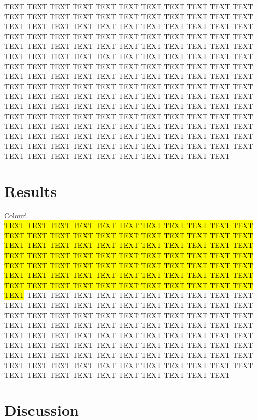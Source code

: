 \documentclass{article}
\begin{document}
TEXT TEXT TEXT TEXT TEXT TEXT TEXT TEXT TEXT TEXT TEXT TEXT TEXT TEXT TEXT TEXT TEXT TEXT TEXT TEXT TEXT TEXT TEXT TEXT TEXT TEXT TEXT TEXT TEXT TEXT TEXT TEXT TEXT TEXT TEXT TEXT TEXT TEXT TEXT TEXT TEXT TEXT TEXT TEXT TEXT TEXT TEXT TEXT TEXT TEXT TEXT TEXT TEXT TEXT TEXT TEXT TEXT TEXT TEXT TEXT TEXT TEXT TEXT TEXT TEXT TEXT TEXT TEXT TEXT TEXT TEXT TEXT TEXT TEXT TEXT TEXT TEXT TEXT TEXT TEXT TEXT TEXT TEXT TEXT TEXT TEXT TEXT TEXT TEXT TEXT TEXT TEXT TEXT TEXT TEXT TEXT TEXT TEXT TEXT TEXT TEXT TEXT TEXT TEXT TEXT TEXT TEXT TEXT TEXT TEXT TEXT TEXT TEXT TEXT TEXT TEXT TEXT TEXT TEXT TEXT TEXT TEXT TEXT TEXT TEXT TEXT TEXT TEXT TEXT TEXT TEXT TEXT TEXT TEXT TEXT TEXT TEXT TEXT TEXT TEXT TEXT TEXT TEXT TEXT TEXT TEXT TEXT TEXT TEXT TEXT TEXT TEXT TEXT TEXT TEXT TEXT TEXT TEXT TEXT TEXT TEXT TEXT TEXT TEXT TEXT TEXT TEXT TEXT TEXT TEXT TEXT TEXT TEXT TEXT TEXT 


\section{Results}
Colour!\\
\hl{TEXT TEXT TEXT TEXT TEXT TEXT TEXT TEXT TEXT TEXT TEXT TEXT TEXT TEXT TEXT TEXT TEXT TEXT TEXT TEXT TEXT TEXT TEXT TEXT TEXT TEXT TEXT TEXT TEXT TEXT TEXT TEXT TEXT TEXT TEXT TEXT TEXT TEXT TEXT TEXT TEXT TEXT TEXT TEXT TEXT TEXT TEXT TEXT TEXT TEXT TEXT TEXT TEXT TEXT TEXT TEXT TEXT TEXT TEXT TEXT TEXT TEXT TEXT TEXT TEXT TEXT TEXT TEXT TEXT TEXT TEXT TEXT TEXT TEXT TEXT TEXT TEXT TEXT} TEXT TEXT TEXT TEXT TEXT TEXT TEXT TEXT TEXT TEXT TEXT TEXT TEXT TEXT TEXT TEXT TEXT TEXT TEXT TEXT TEXT TEXT TEXT TEXT TEXT TEXT TEXT TEXT TEXT TEXT TEXT TEXT TEXT TEXT TEXT TEXT TEXT TEXT TEXT TEXT TEXT TEXT TEXT TEXT TEXT TEXT TEXT TEXT TEXT TEXT TEXT TEXT TEXT TEXT TEXT TEXT TEXT TEXT TEXT TEXT TEXT TEXT TEXT TEXT TEXT TEXT TEXT TEXT TEXT TEXT TEXT TEXT TEXT TEXT TEXT TEXT TEXT TEXT TEXT TEXT TEXT TEXT TEXT TEXT TEXT TEXT TEXT TEXT TEXT TEXT TEXT TEXT TEXT TEXT TEXT TEXT TEXT 

\section{Discussion}
\end{document}
